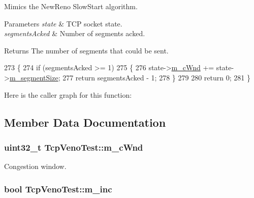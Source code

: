 Mimics the New\+Reno Slow\+Start algorithm. 


\begin{DoxyParams}{Parameters}
{\em state} & T\+CP socket state. \\
\hline
{\em segments\+Acked} & Number of segments acked. \\
\hline
\end{DoxyParams}
\begin{DoxyReturn}{Returns}
The number of segments that could be sent. 
\end{DoxyReturn}

\begin{DoxyCode}
273 \{
274   \textcolor{keywordflow}{if} (segmentsAcked >= 1)
275     \{
276       state->\hyperlink{classns3_1_1TcpSocketState_a7cd3d2156a483c1db436097477a0fd7f}{m\_cWnd} += state->\hyperlink{classns3_1_1TcpSocketState_a079872f7b0099ef5f3cab4ff47bd2edd}{m\_segmentSize};
277       \textcolor{keywordflow}{return} segmentsAcked - 1;
278     \}
279 
280   \textcolor{keywordflow}{return} 0;
281 \}
\end{DoxyCode}


Here is the caller graph for this function\+:




\subsection{Member Data Documentation}
\subsubsection[{\texorpdfstring{m\+\_\+c\+Wnd}{m_cWnd}}]{\setlength{\rightskip}{0pt plus 5cm}uint32\+\_\+t Tcp\+Veno\+Test\+::m\+\_\+c\+Wnd\hspace{0.3cm}{\ttfamily [private]}}\hypertarget{classTcpVenoTest_aa65e90c7ba8b3f0779f2afbad9a383e1}{}\label{classTcpVenoTest_aa65e90c7ba8b3f0779f2afbad9a383e1}


Congestion window. 

\subsubsection[{\texorpdfstring{m\+\_\+inc}{m_inc}}]{\setlength{\rightskip}{0pt plus 5cm}bool Tcp\+Veno\+Test\+::m\+\_\+inc\hspace{0.3cm}{\ttfamily [private]}}\hypertarget{classTcpVenoTest_a447f72854c411771e834e6084fe9b0c4}{}\label{classTcpVenoTest_a447f72854c411771e834e6084fe9b0c4}


